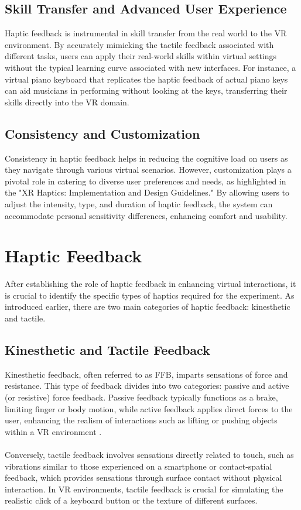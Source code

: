 \subsection{Skill Transfer and Advanced User Experience}
\label{sec:SkillTransferUserExperience}
Haptic feedback is instrumental in skill transfer from the real world to the \ac{VR} environment. By accurately mimicking the tactile feedback associated with different tasks, users can apply their real-world skills within virtual settings without the typical learning curve associated with new interfaces. For instance, a virtual piano keyboard that replicates the haptic feedback of actual piano keys can aid musicians in performing without looking at the keys, transferring their skills directly into the \ac{VR} domain.

\subsection{Consistency and Customization}
\label{sec:Consistency}
Consistency in haptic feedback helps in reducing the cognitive load on users as they navigate through various virtual scenarios. However, customization plays a pivotal role in catering to diverse user preferences and needs, as highlighted in the "XR Haptics: Implementation and Design Guidelines." By allowing users to adjust the intensity, type, and duration of haptic feedback, the system can accommodate personal sensitivity differences, enhancing comfort and usability.

\section{Haptic Feedback}
\label{sec:HapticFeedback}

After establishing the role of haptic feedback in enhancing virtual interactions, it is crucial to identify the specific types of haptics required for the experiment. As introduced earlier, there are two main categories of haptic feedback: kinesthetic and tactile.

\subsection{Kinesthetic and Tactile Feedback}
\label{subsec:KinestheticTactileFeedback} 
Kinesthetic feedback, often referred to as \ac{FFB}, imparts sensations of force and resistance. This type of feedback divides into two categories: passive and active (or resistive) force feedback. Passive feedback typically functions as a brake, limiting finger or body motion, while active feedback applies direct forces to the user, enhancing the realism of interactions such as lifting or pushing objects within a \ac{VR} environment \cite{hayward2022xr}.\\\\
Conversely, tactile feedback involves sensations directly related to touch, such as vibrations similar to those experienced on a smartphone or contact-spatial feedback, which provides sensations through surface contact without physical interaction. In \ac{VR} environments, tactile feedback is crucial for simulating the realistic click of a keyboard button or the texture of different surfaces.

